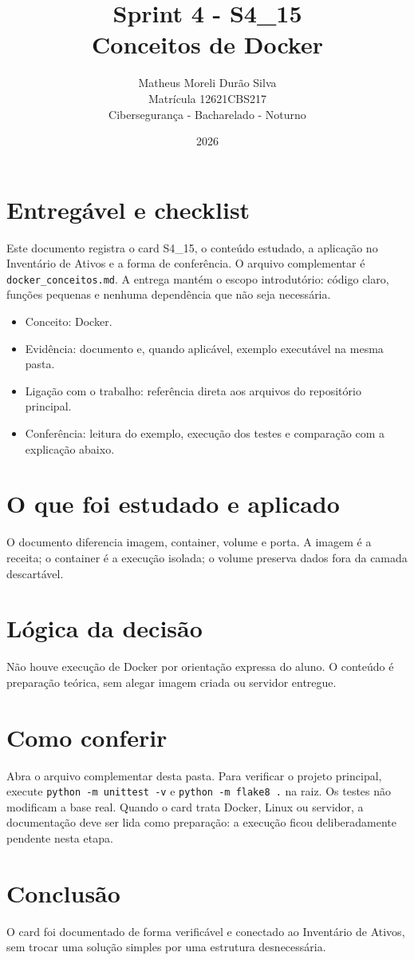 \documentclass[12pt]{article}
\title{Sprint 4 - S4\_15\\Conceitos de Docker}
\author{Matheus Moreli Durão Silva\\ Matrícula 12621CBS217\\ Cibersegurança - Bacharelado - Noturno}
\date{2026}
\begin{document}
\maketitle

\section*{Entregável e checklist}
Este documento registra o card S4\_15, o conteúdo estudado, a aplicação no Inventário de Ativos e a forma de conferência. O arquivo complementar é \texttt{docker\_conceitos.md}. A entrega mantém o escopo introdutório: código claro, funções pequenas e nenhuma dependência que não seja necessária.

\begin{itemize}
\item Conceito: Docker.
\item Evidência: documento e, quando aplicável, exemplo executável na mesma pasta.
\item Ligação com o trabalho: referência direta aos arquivos do repositório principal.
\item Conferência: leitura do exemplo, execução dos testes e comparação com a explicação abaixo.
\end{itemize}

\section*{O que foi estudado e aplicado}
O documento diferencia imagem, container, volume e porta. A imagem é a receita; o container é a execução isolada; o volume preserva dados fora da camada descartável.

\section*{Lógica da decisão}
Não houve execução de Docker por orientação expressa do aluno. O conteúdo é preparação teórica, sem alegar imagem criada ou servidor entregue.

\section*{Como conferir}
Abra o arquivo complementar desta pasta. Para verificar o projeto principal, execute \texttt{python -m unittest -v} e \texttt{python -m flake8 .} na raiz. Os testes não modificam a base real. Quando o card trata Docker, Linux ou servidor, a documentação deve ser lida como preparação: a execução ficou deliberadamente pendente nesta etapa.

\section*{Conclusão}
O card foi documentado de forma verificável e conectado ao Inventário de Ativos, sem trocar uma solução simples por uma estrutura desnecessária.
\end{document}
